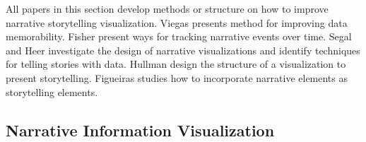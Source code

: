 \documentclass{egpubl}
\begin{document}
All papers in this section develop methods or structure on how to improve narrative storytelling visualization. Viegas \cite{viegas2004} presents method for improving data memorability. Fisher \cite{fisher} present ways for tracking narrative events over time. Segal and Heer \cite{segal} investigate the design of narrative visualizations and identify techniques for telling stories with data. Hullman \cite{hullman,hullman2013,hullman2013deeper}
design the structure of a visualization to present storytelling.  Figueiras \cite{figueiras,figueiras2014tell} studies how to incorporate narrative elements as storytelling elements.

\subsection{Narrative Information Visualization}
\end{document}
